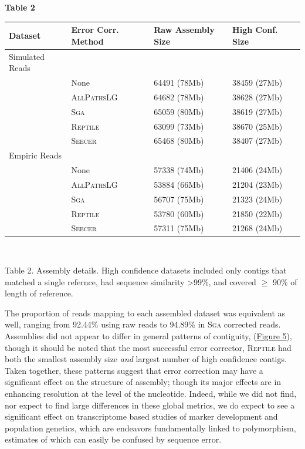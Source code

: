 \documentclass[11pt]{article}
\begin{document}
\noindent
\textbf{\hypertarget{Table 2}{Table 2}} \\
\begin{center}
    \begin{tabular}{ | l | l | l  | l | l |}
    \hline
    Dataset & Error Corr. Method &  Raw Assembly Size & High Conf. Size  \\ \hline
    Simulated Reads & & & \\ \hline
     & None & 64491 (78Mb)&38459 (27Mb)  \\ \hline
     & \textsc{AllPathsLG} &64682 (78Mb) & 38628 (27Mb) \\ \hline
     & \textsc{Sga} &65059 (80Mb) & 38619 (27Mb)\\ \hline
     & \textsc{Reptile} &63099 (73Mb) &38670 (25Mb)  \\ \hline
     & \textsc{Seecer} &65468 (80Mb) & 38407 (27Mb) \\ \hline
Empiric Reads & & & \\ \hline
     & None &57338 (74Mb) & 21406 (24Mb)\\ \hline
     & \textsc{AllPathsLG} &53884 (66Mb) & 21204 (23Mb)\\ \hline
     & \textsc{Sga} &56707 (75Mb) & 21323 (24Mb) \\ \hline
     & \textsc{Reptile} &53780 (60Mb) & 21850 (22Mb)\\ \hline
     & \textsc{Seecer} &57311 (75Mb) & 21268 (24Mb) \\ \hline

  \end{tabular}
\\
\end{center}
\noindent
\begin{changemargin}{2cm}{2cm}
Table 2. Assembly details. High confidence datasets included only contigs that matched a single refernce, had sequence similarity \textgreater 99\%, and covered $\geq$ 90\% of length of reference. 
\end{changemargin}

\vspace{10mm}
\noindent
The proportion of reads mapping to each assembled dataset was equivalent as well, ranging from 92.44\% using raw reads to 94.89\% in \textsc{Sga} corrected reads.  Assemblies did not appear to differ in general patterns of contiguity,  (\hyperlink{Figure 5}{Figure 5}), though it should be noted that the most successful error corrector, \textsc{Reptile} had both the smallest assembly size \textit{and} largest number of high confidence contigs.  Taken together, these patterns suggest that error correction may have a significant effect on the structure of assembly; though its major effects are in enhancing resolution at the level of the nucleotide. Indeed, while we did not find, nor expect to find large differences in these global metrics, we do expect to see a significant effect on transcriptome based studies of marker development and population genetics, which are endeavors fundamentally linked to polymorphism, estimates of which can easily be confused by sequence error.    \\
 
\end{document}
